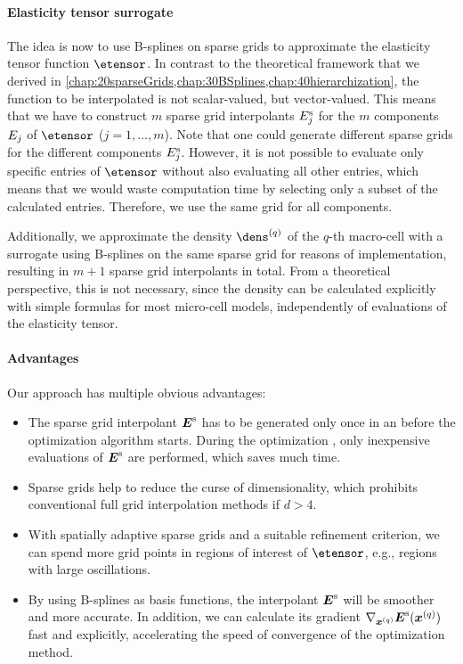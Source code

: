\paragraph{Elasticity tensor surrogate}

The idea is now to use B-splines on sparse grids to approximate
the elasticity tensor function $\etensor$.
In contrast to the theoretical framework that we derived in
\cref{chap:20sparseGrids,chap:30BSplines,chap:40hierarchization},
the function to be interpolated is not scalar-valued, but vector-valued.
This means that we have to construct $m$ sparse grid interpolants
$E_{j}^{\mathrm{s}}$
for the $m$ components $E_{j}$ of $\etensor$ ($j = 1, \dotsc, m$).
Note that one could generate different sparse grids for the
different components $E_{j}^{\mathrm{s}}$.
However, it is not possible to evaluate only specific entries of $\etensor$
without also evaluating all other entries,
which means that we would waste computation time by selecting only
a subset of the calculated entries.
Therefore, we use the same grid for all components.

Additionally, we approximate the density $\dens^{(q)}$
of the $q$-th macro-cell with a surrogate using
B-splines on the same sparse grid for reasons of implementation,
resulting in $m + 1$ sparse grid interpolants in total.
From a theoretical perspective, this is not necessary,
since the density can be calculated explicitly with simple formulas
for most micro-cell models, independently of evaluations of the
elasticity tensor.

\paragraph{Advantages}

Our approach has multiple obvious advantages:
\begin{itemize}
  \item
  The sparse grid interpolant ${\boldsymbol{E}}^{\mathrm{s}}$ has to be generated only
  once in an  before the optimization algorithm starts.
  During the optimization ,
  only inexpensive evaluations of ${\boldsymbol{E}}^{\mathrm{s}}$ are performed,
  which saves much time.
  
  \item
  Sparse grids help to reduce the curse of dimensionality, which prohibits
  conventional full grid interpolation methods if $d > 4$.
  
  \item
  With spatially adaptive sparse grids and a suitable refinement criterion,
  we can spend more grid points in regions of interest of $\etensor$,
  e.g., regions with large oscillations.
  
  \item
  By using B-splines as basis functions,
  the interpolant ${\boldsymbol{E}}^{\mathrm{s}}$ will be smoother and more accurate.
  In addition, we can calculate its gradient
  $\nabla_{{\boldsymbol{x}}^{(q)}} {\boldsymbol{E}}^{\mathrm{s}}({\boldsymbol{x}}^{(q)})$ fast and explicitly,
  accelerating the speed of convergence of the optimization method.
\end{itemize}



